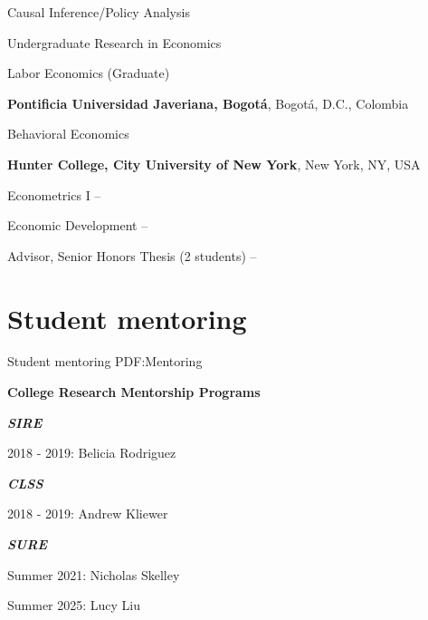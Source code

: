\documentclass[letterpaper,10pt,oneside]{article}
\begin{document}
\begin{body}
\par
Causal Inference/Policy Analysis
\hfill

Undergraduate Research in Economics
\hfill

Labor Economics (Graduate)
\hfill


\smallskip
\smallskip


\textbf{Pontificia Universidad Javeriana, Bogot\'{a}},
Bogot\'{a}, D.C., Colombia
\par
Behavioral Economics
\hfill
{}

\smallskip
\smallskip

\textbf{Hunter College, City University of New York},
New York, NY, USA
\par
Econometrics I
\hfill
{} --
\par
Economic Development
\hfill
{} --
\par
Advisor, Senior Honors Thesis (2 students)
\hfill
{} --


\section
{Student mentoring}
{Student mentoring}
{PDF:Mentoring}

\par
\textbf{College Research Mentorship Programs}
\hfill

\par
\textit{\textbf{SIRE}}
\par
2018 - 2019: Belicia Rodriguez

\textit{\textbf{CLSS}}
\par
2018 - 2019: Andrew Kliewer

\textit{\textbf{SURE}}
\par
Summer 2021: Nicholas Skelley
\par
Summer 2025: Lucy Liu

\bigskip


\end{body}
\end{document}
